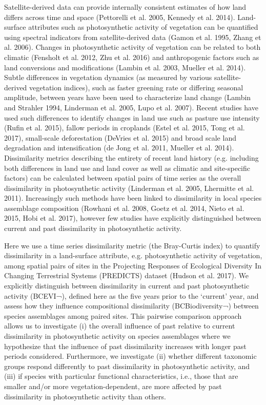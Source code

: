 {	Satellite-derived data can provide internally consistent estimates of how land differs across time and space (Pettorelli et al. 2005, Kennedy et al. 2014). Land-surface attributes such as photosynthetic activity of vegetation can be quantified using spectral indicators from satellite-derived data (Gamon et al. 1995, Zhang et al. 2006). Changes in photosynthetic activity of vegetation can be related to both climatic (Fensholt et al. 2012, Zhu et al. 2016) and anthropogenic factors such as land conversions and modifications (Lambin et al. 2003, Mueller et al. 2014). Subtle differences in vegetation dynamics (as measured by various satellite-derived vegetation indices), such as faster greening rate or differing seasonal amplitude, between years have been used to characterize land change (Lambin and Strahler 1994, Linderman et al. 2005, Lupo et al. 2007). Recent studies have used such differences to identify changes in land use such as pasture use intensity (Rufin et al. 2015), fallow periods in croplands (Estel et al. 2015, Tong et al. 2017), small-scale deforestation (DeVries et al. 2015) and broad scale land degradation and intensification (de Jong et al. 2011, Mueller et al. 2014).  Dissimilarity metrics describing the entirety of recent land history (e.g. including both differences in land use and land cover as well as climatic and site-specific factors) can be calculated between spatial pairs of time series as the overall dissimilarity in photosynthetic activity (Linderman et al. 2005, Lhermitte et al. 2011). Increasingly such methods have been linked to dissimilarity in local species assemblage composition (Rowhani et al. 2008, Goetz et al. 2014, Nieto et al. 2015, Hobi et al. 2017), however few studies have explicitly distinguished between current and past dissimilarity in photosynthetic activity.
	
	Here we use a time series dissimilarity metric (the Bray-Curtis index) to quantify dissimilarity in a land-surface attribute, e.g. photosynthetic activity of vegetation, among spatial pairs of sites in the Projecting Responses of Ecological Diversity In Changing Terrestrial Systems (PREDICTS) dataset (Hudson et al. 2017). We explicitly distinguish between dissimilarity in current and past photosynthetic activity (BCEVI¬), defined here as the five years prior to the ‘current’ year, and assess how they influence compositional dissimilarity (BCBiodiversity¬) between species assemblages among paired sites. This pairwise comparison approach allows us to investigate (i) the overall influence of past relative to current dissimilarity in photosynthetic activity on species assemblages where we hypothesize that the influence of past dissimilarity increases with longer past periods considered. Furthermore, we investigate (ii) whether different taxonomic groups respond differently to past dissimilarity in photosynthetic activity, and (iii) if species with particular functional characteristics, i.e., those that are smaller and/or more vegetation-dependent, are more affected by past dissimilarity in photosynthetic activity than others. 

}
